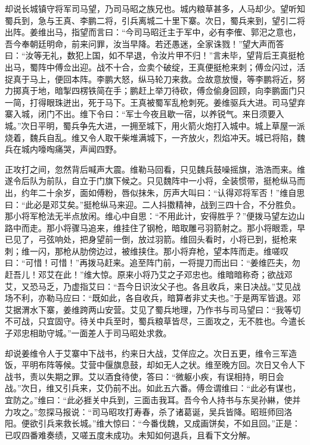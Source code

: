 却说长城镇守将军司马望，乃司马昭之族兄也。城内粮草甚多，人马却少。望听知蜀兵到，急与王真、李鹏二将，引兵离城二十里下寨。次日，蜀兵来到，望引二将出阵。姜维出马，指望而言曰：“今司马昭迁主于军中，必有李傕、郭汜之意也，吾今奉朝廷明命，前来问罪，汝当早降。若还愚迷，全家诛戮！”望大声而答曰：“汝等无礼，数犯上国，如不早退，令汝片甲不归！”言未毕，望背后王真挺枪出马，蜀阵中傅佥出迎。战不十合，佥卖个破绽，王真便挺枪来刺；傅佥闪过，活捉真于马上，便回本阵。李鹏大怒，纵马轮刀来救。佥故意放慢，等李鹏将近，努力掷真于地，暗掣四楞铁简在手；鹏赶上举刀待砍，傅佥偷身回顾，向李鹏面门只一简，打得眼珠迸出，死于马下。王真被蜀军乱枪刺死。姜维驱兵大进。司马望弃寨入城，闭门不出。维下令曰：“军士今夜且歇一宿，以养锐气。来日须要入城。”次日平明，蜀兵争先大进，一拥至城下，用火箭火炮打入城中。城上草屋一派烧着，魏兵自乱。维又令人取干柴堆满城下，一齐放火，烈焰冲天。城已将陷，魏兵在城内嚎啕痛哭，声闻四野。

正攻打之间，忽然背后喊声大震。维勒马回看，只见魏兵鼓噪摇旗，浩浩而来。维遂令后队为前队，自立于门旗下候之。只见魏阵中一小将，全装惯带，挺枪纵马而出，约年二十余岁，面如傅粉，唇似抹朱，厉声大叫曰：“认得邓将军否！”维自思曰：“此必是邓艾矣。”挺枪纵马来迎。二人抖擞精神，战到三四十合，不分胜负。那小将军枪法无半点放闲。维心中自思：“不用此计，安得胜乎？”便拨马望左边山路中而走。那小将骤马追来，维挂住了钢枪，暗取雕弓羽箭射之。那小将眼乖，早已见了，弓弦响处，把身望前一倒，放过羽箭。维回头看时，小将已到，挺枪来刺；维一闪，那枪从肋傍边过，被维挟住。那小将弃枪，望本阵而走。维嗟叹曰：“可惜！可惜！”再拨马赶来。追至阵门前，一将提刀而出曰：“姜维匹夫，勿赶吾儿！邓艾在此！”维大惊。原来小将乃艾之子邓忠也。维暗暗称奇；欲战邓艾，又恐马乏，乃虚指艾曰：“吾今日识汝父子也。各且收兵，来日决战。”艾见战场不利，亦勒马应曰：“既如此，各自收兵，暗算者非丈夫也。”于是两军皆退。邓艾据渭水下寨，姜维跨两山安营。艾见了蜀兵地理，乃作书与司马望曰：“我等切不可战，只宜固守。待关中兵至时，蜀兵粮草皆尽，三面攻之，无不胜也。今遣长子邓忠相助守城。”一面差人于司马昭处求救。

却说姜维令人于艾寨中下战书，约来日大战，艾佯应之。次日五更，维令三军造饭，平明布阵等候。艾营中偃旗息鼓，却如无人之状。维至晚方回。次日又令人下战书，责以失期之罪。艾以酒食待使，答曰：“微躯小疾，有误相持，明日会战。”次日，维又引兵来，艾仍前不出。如此五六番。傅佥谓维曰：“此必有谋也，宜防之。”维曰：“此必捱关中兵到，三面击我耳。吾今令人持书与东吴孙綝，使并力攻之。”忽探马报说：“司马昭攻打寿春，杀了诸葛诞，吴兵皆降。昭班师回洛阳。便欲引兵来救长城。”维大惊曰：“今番伐魏，又成画饼矣，不如且回。”正是：已叹四番难奏绩，又嗟五度未成功。未知如何退兵，且看下文分解。